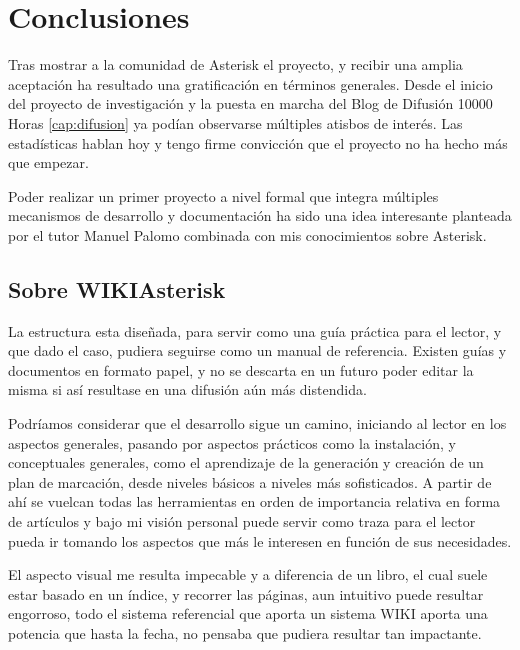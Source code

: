 
\section{Conclusiones}

Tras mostrar a la comunidad de Asterisk el proyecto, y recibir una amplia aceptación ha resultado una gratificación en términos generales. Desde el inicio del proyecto de investigación y la puesta en marcha del Blog de Difusión 10000 Horas \ref{cap:difusion} ya podían observarse múltiples atisbos de interés. Las estadísticas hablan hoy y tengo firme convicción que el proyecto no ha hecho más que empezar.

Poder realizar un primer proyecto a nivel formal que integra múltiples mecanismos de desarrollo y documentación ha sido una idea interesante planteada por el tutor Manuel Palomo combinada con mis conocimientos sobre Asterisk.

\subsection{Sobre WIKIAsterisk}

La estructura esta diseñada, para servir como una guía práctica para el lector, y que dado el caso, pudiera seguirse como un manual de referencia. Existen guías y documentos en formato papel, y no se descarta en un futuro poder editar la misma si así resultase en una difusión aún más distendida.

Podríamos considerar que el desarrollo sigue un camino, iniciando al lector en los aspectos generales, pasando por aspectos prácticos como la instalación, y conceptuales generales, como el aprendizaje de la generación y creación de un plan de marcación, desde niveles básicos a niveles más sofisticados. A partir de ahí se vuelcan todas las herramientas en orden de importancia relativa en forma de artículos y bajo mi visión personal puede servir como traza para el lector pueda ir tomando los aspectos que más le interesen en función de sus necesidades.

El aspecto visual me resulta impecable y a diferencia de un libro, el cual suele estar basado en un índice, y recorrer las páginas, aun intuitivo puede resultar engorroso, todo el sistema referencial que aporta un sistema WIKI aporta una potencia que hasta la fecha, no pensaba que pudiera resultar tan impactante. 

